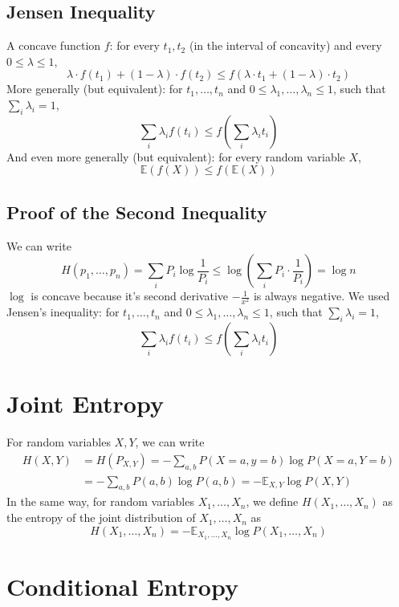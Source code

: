 \documentclass{article}
\begin{document}
\subsection{Jensen Inequality}

A concave function $f$: for every $t_1,t_2$ (in the interval of concavity) and every $0\leq \lambda \leq 1$,
\[
\lambda \cdot f(t_1) + (1-\lambda) \cdot f(t_2)\leq f\left(\lambda\cdot t_1 + \left(1-\lambda\right)\cdot t_2\right)
\]
More generally (but equivalent): for $t_1,\ldots, t_n$ and $0\leq \lambda_1,\ldots,\lambda_n\leq 1$, such that $\sum_i\lambda_i=1$,
\[
\sum_i \lambda_i f(t_i)\leq f\left(\sum_i \lambda_i t_i \right)
\]
And even more generally (but equivalent): for every random variable $X$,
\[
\mathbb{E}(f(X)) \leq f(\mathbb{E}(X))
\]

\subsection{Proof of the Second Inequality}

We can write
\[
H(p_1,\ldots,p_n) = \sum_i P_i \log\frac{1}{P_i} \leq \log \left(\sum_i P_i \cdot \frac{1}{P_i}\right) = \log n
\]
$\log$ is concave because it's second derivative $-\frac{1}{x^2}$ is always negative. We used Jensen's inequality: for $t_1,\ldots, t_n$ and $0\leq \lambda_1,\ldots,\lambda_n\leq 1$, such that $\sum_i\lambda_i=1$,
\[
\sum_i \lambda_i f(t_i)\leq f\left(\sum_i \lambda_i t_i \right)
\]

\section{Joint Entropy}

For random variables $X,Y$, we can write 
\begin{align}
    H(X,Y) &= H(P_{X,Y})=-\sum_{a,b}P\left(X=a,y=b\right)\log P\left(X=a,Y=b\right)\\
    &=-\sum_{a,b} P(a,b)\log P(a,b) = - \mathbb{E}_{X,Y}\log P(X,Y)
\end{align}
In the same way, for random variables $X_1,\ldots, X_n$, we define $H(X_1,\ldots, X_n)$ as the entropy of the joint distribution of $X_1,\ldots,X_n$ as 
\begin{equation}
    H\left(X_1,\ldots, X_n\right) = -\mathbb{E}_{X_1,\ldots,X_n}\log P(X_1,\ldots,X_n)
\end{equation}

\section{Conditional Entropy}
\end{document}
